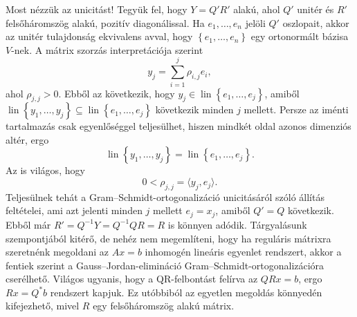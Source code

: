 \documentclass[a4paper, showtrims]{memoir}
\makeatletter
\renewenvironment{proof}[1][\proofname]
    {\par\pushQED{\qed}%
    \normalfont \topsep6\p@\@plus6\p@\relax
    \trivlist
    \item[\hskip\labelsep
        \itshape
    #1\@addpunct{:}]\ignorespaces}
    {\popQED\endtrivlist\@endpefalse}
\theoremstyle{plain}
\theoremstyle{remark}
\theoremstyle{definition}
\DeclareMathOperator{\lin}{lin}
\newcommand{\ip}[2]{\langle#1,#2\rangle}
\makeatother
\begin{document}
\begin{proof}
    Most nézzük az unicitást!
    Tegyük fel, hogy $Y=Q'R'$ alakú, ahol $Q'$ unitér és $R'$ felsőháromszög alakú, pozitív diagonálissal.
    Ha $e_1,\dots,e_n$ jelöli $Q'$ oszlopait, akkor az unitér tulajdonság ekvivalens avval, hogy $\left\{ e_1,\dots,e_n \right\}$
    egy ortonormált bázisa $V$-nek. A mátrix szorzás interpretációja szerint
    \[
        y_j
        =
        \sum_{i=1}^j\rho_{i,j}e_i,
    \]
    ahol $\rho_{j,j}>0$.
    Ebből az következik, hogy $y_j\in\lin\left\{ e_1,\dots,e_j \right\}$, amiből
    $\lin\left\{ y_1,\dots,y_j \right\}\subseteq\lin\left\{ e_1,\dots,e_j \right\}$ következik minden $j$ mellett.
    Persze az iménti tartalmazás csak egyenlőséggel teljesülhet, hiszen mindkét oldal azonos dimenziós altér,
    ergo
    \[
      \lin\left\{ y_1,\dots,y_j \right\}
      =
      \lin\left\{ e_1,\dots,e_j \right\}.
    \]
    Az is világos, hogy
    \[
        0<\rho_{j,j}=\ip{y_j}{e_j}.
    \]
    Teljesülnek tehát a Gram--Schmidt-ortogonalizáció unicitásáról szóló állítás feltételei,
    ami azt jelenti minden $j$ mellett $e_j=x_j$, amiből $Q'=Q$ következik.
    Ebből már $R'=Q^{-1}Y=Q^{-1}QR=R$ is könnyen adódik.
\end{proof}
Tárgyalásunk szempontjából kitérő, de nehéz nem megemlíteni, hogy ha reguláris mátrixra szeretnénk megoldani az $Ax=b$
inhomogén lineáris egyenlet rendszert, akkor a fentiek szerint a Gauss--Jordan-elimináció Gram--Schmidt-ortogonalizációra
cserélhető. Világos ugyanis, hogy a QR-felbontást felírva az $QRx=b$, ergo $Rx=Q^\ast b$ rendszert kapjuk.
Ez utóbbiból az egyetlen megoldás könnyedén kifejezhető, mivel $R$ egy felsőháromszög alakú mátrix.
\end{document}
